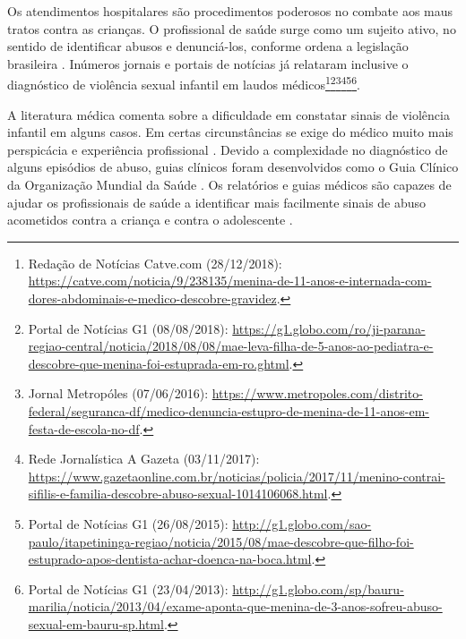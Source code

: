 Os atendimentos hospitalares são procedimentos poderosos no combate aos maus tratos contra as crianças. O profissional de saúde surge como um sujeito ativo, no sentido de identificar abusos e denunciá-los, conforme ordena a legislação brasileira \cite{costa2019maus}. Inúmeros jornais e portais de notícias já relataram inclusive o diagnóstico de violência sexual infantil em laudos médicos\footnote{Redação de Notícias Catve.com (28/12/2018): \url{https://catve.com/noticia/9/238135/menina-de-11-anos-e-internada-com-dores-abdominais-e-medico-descobre-gravidez}.}\footnote{Portal de Notícias G1 (08/08/2018): \url{https://g1.globo.com/ro/ji-parana-regiao-central/noticia/2018/08/08/mae-leva-filha-de-5-anos-ao-pediatra-e-descobre-que-menina-foi-estuprada-em-ro.ghtml}.}\footnote{Jornal Metropóles (07/06/2016): \url{https://www.metropoles.com/distrito-federal/seguranca-df/medico-denuncia-estupro-de-menina-de-11-anos-em-festa-de-escola-no-df}.}\footnote{Rede Jornalística A Gazeta (03/11/2017): \url{https://www.gazetaonline.com.br/noticias/policia/2017/11/menino-contrai-sifilis-e-familia-descobre-abuso-sexual-1014106068.html}.}\footnote{Portal de Notícias G1 (26/08/2015): \url{http://g1.globo.com/sao-paulo/itapetininga-regiao/noticia/2015/08/mae-descobre-que-filho-foi-estuprado-apos-dentista-achar-doenca-na-boca.html}.}\footnote{Portal de Notícias G1 (23/04/2013): \url{http://g1.globo.com/sp/bauru-marilia/noticia/2013/04/exame-aponta-que-menina-de-3-anos-sofreu-abuso-sexual-em-bauru-sp.html}.}.%



A literatura médica comenta sobre a dificuldade em constatar sinais de violência infantil em alguns casos. Em certas circunstâncias se exige do médico muito mais perspicácia e experiência profissional \cite{de2012violencia}. Devido a complexidade no diagnóstico de alguns episódios de abuso, guias clínicos foram desenvolvidos como o Guia Clínico da Organização Mundial da Saúde \cite{world2017responding}. Os relatórios e guias médicos são capazes de ajudar os profissionais de saúde a identificar mais facilmente sinais de abuso acometidos contra a criança e contra o adolescente \cite{Christian1}.


